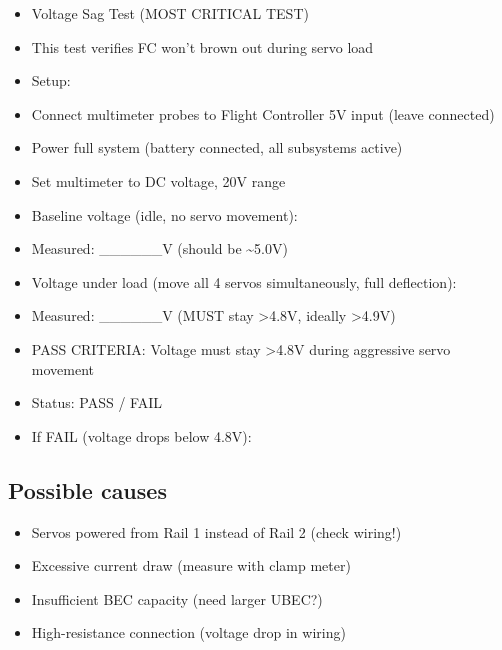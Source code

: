\documentclass[11pt,letterpaper]{article}
\begin{document}
\begin{itemize}
  \item Voltage Sag Test (MOST CRITICAL TEST)
  \item [WARNING] This test verifies FC won't brown out during servo load
\end{itemize}

\begin{itemize}
  \item Setup:
  \item Connect multimeter probes to Flight Controller 5V input (leave connected)
  \item Power full system (battery connected, all subsystems active)
  \item Set multimeter to DC voltage, 20V range
\end{itemize}

\begin{itemize}
  \item Baseline voltage (idle, no servo movement):
  \item Measured: \_\_\_\_\_\_V    (should be \textasciitilde{}5.0V)
\end{itemize}

\begin{itemize}
  \item Voltage under load (move all 4 servos simultaneously, full deflection):
  \item Measured: \_\_\_\_\_\_V    (MUST stay >4.8V, ideally >4.9V)
\end{itemize}

\begin{itemize}
  \item PASS CRITERIA: Voltage must stay >4.8V during aggressive servo movement
  \item Status: PASS / FAIL
\end{itemize}

\begin{itemize}
  \item If FAIL (voltage drops below 4.8V):
\end{itemize}

\subsection{Possible causes}

\begin{itemize}
  \item Servos powered from Rail 1 instead of Rail 2 (check wiring!)
  \item Excessive current draw (measure with clamp meter)
  \item Insufficient BEC capacity (need larger UBEC?)
  \item High-resistance connection (voltage drop in wiring)
\end{itemize}
\end{document}
